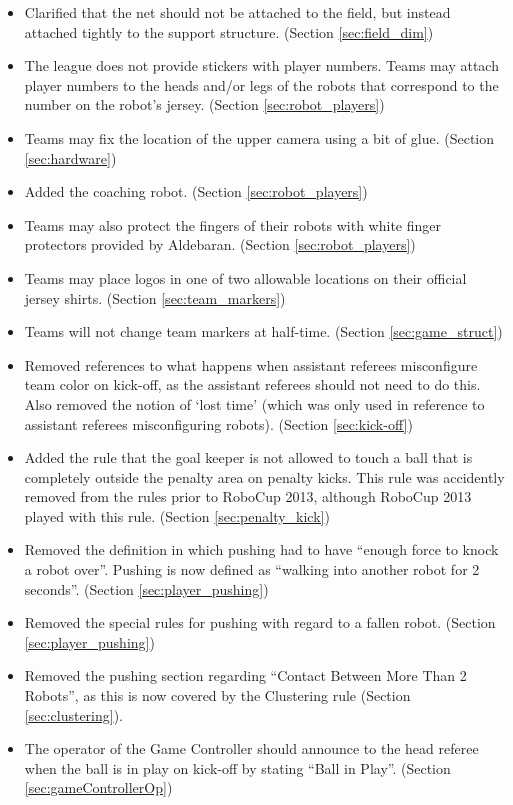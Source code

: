 \documentclass[12pt]{article}
\begin{document}
\begin{itemize}
	\item Clarified that the net should not be attached to the field, but instead attached tightly to the support structure. (Section \ref{sec:field_dim})
	\item The league does not provide stickers with player numbers.  Teams may attach player numbers to the heads and/or legs of the robots that correspond to the number on the robot's jersey. (Section \ref{sec:robot_players})
	\item Teams may fix the location of the upper camera using a bit of glue. (Section \ref{sec:hardware})
    \item Added the coaching robot. (Section \ref{sec:robot_players})
	\item Teams may also protect the fingers of their robots with white finger protectors provided by Aldebaran. (Section \ref{sec:robot_players})
	\item Teams may place logos in one of two allowable locations on their official jersey shirts. (Section \ref{sec:team_markers})
	\item Teams will not change team markers at half-time. (Section \ref{sec:game_struct})
	\item Removed references to what happens when assistant referees misconfigure team color on kick-off, as the assistant referees should not need to do this.  Also removed the notion of `lost time' (which was only used in reference to assistant referees misconfiguring robots). (Section \ref{sec:kick-off})
	\item Added the rule that the goal keeper is not allowed to touch a ball that is completely outside the penalty area on penalty kicks.  This rule was accidently removed from the rules prior to RoboCup 2013, although RoboCup 2013 played with this rule. (Section \ref{sec:penalty_kick})
	\item Removed the definition in which pushing had to have ``enough force to knock a robot over''.  Pushing is now defined as ``walking into another robot for 2 seconds''. (Section \ref{sec:player_pushing})
	\item Removed the special rules for pushing with regard to a fallen robot. (Section \ref{sec:player_pushing})
	\item Removed the pushing section regarding ``Contact Between More Than 2 Robots'', as this is now covered by the Clustering rule (Section \ref{sec:clustering}).
	\item The operator of the Game Controller should announce to the head referee when the ball is in play on kick-off by stating ``Ball in Play''. (Section \ref{sec:gameControllerOp})

\end{itemize}
\end{document}
